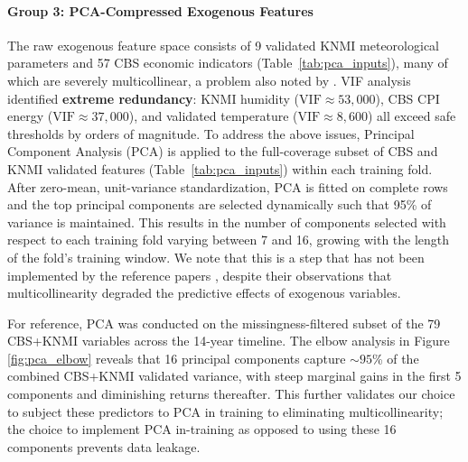 \paragraph{Group 3: PCA-Compressed Exogenous Features}
\label{par:pca_features}

The raw exogenous feature space consists of 9 validated KNMI meteorological parameters and 57 CBS economic indicators (Table~\ref{tab:pca_inputs}), many of which are severely multicollinear, a problem also noted by \cite{ashtar_hybrid_2025,van_de_sande_enhancing_2024,curiel_integrating_2025}. VIF analysis identified \textbf{extreme redundancy}: KNMI humidity ($\text{VIF} \approx 53{,}000$), CBS CPI energy ($\text{VIF} \approx 37{,}000$), and validated temperature ($\text{VIF} \approx 8{,}600$) all exceed safe thresholds by orders of magnitude. To address the above issues, Principal Component Analysis (PCA) is applied to the full-coverage subset of CBS and KNMI validated features (Table~\ref{tab:pca_inputs}) within each training fold. After zero-mean, unit-variance standardization, PCA is fitted on complete rows and the top principal components are selected dynamically such that 95\% of variance is maintained. This results in the number of components selected with respect to each training fold varying between 7 and 16, growing with the length of the fold's training window. We note that this is a step that has not been implemented by the reference papers \cite{ashtar_hybrid_2025,van_de_sande_enhancing_2024,curiel_integrating_2025}, despite their observations that multicollinearity degraded the predictive effects of exogenous variables.

For reference, PCA was conducted on the missingness-filtered subset of the 79 CBS+KNMI variables across the 14-year timeline. The elbow analysis in Figure \ref{fig:pca_elbow} reveals that 16 principal components capture ${\sim}95$\% of the combined CBS+KNMI validated variance, with steep marginal gains in the first 5 components and diminishing returns thereafter. This further validates our choice to subject these predictors to PCA in training to eliminating multicollinearity; the choice to implement PCA in-training as opposed to using these 16 components prevents data leakage.

